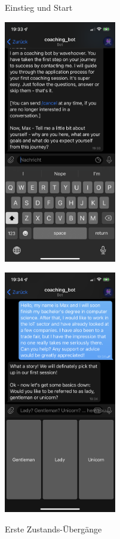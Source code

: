 \begin{figure}
\begin{minipage}{.48\linewidth}
		  \caption{Einstieg und Start}
		\end{minipage}\quad
		\begin{minipage}{.48\linewidth}
		  \centering
			{\includegraphics[width=\linewidth,height=300pt,keepaspectratio]{images/Screenshots/bio.PNG}}
	  
			{\includegraphics[width=\linewidth,height=300pt,keepaspectratio]{images/Screenshots/gender.PNG}}
	  
		  \caption{Erste Zustands-Übergänge}
		\end{minipage}
	\end{figure}


